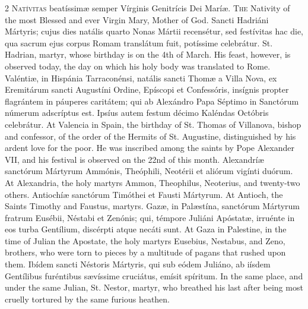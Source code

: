 \begin{paracol}{2}
\lettrine[lines=2]{N}{atívitas} beatíssimæ 
 semper Vírginis Genitrícis Dei Maríæ.
\switchcolumn
{}
\lettrine[lines=2]{T}{he} Nativity of the most Blessed and 
 ever Virgin Mary, Mother of God.
\switchcolumn*
{}
Sancti Hadriáni 
 Mártyris; cujus dies natális quarto Nonas Mártii recensétur, sed festívitas 
 hac die, qua sacrum ejus corpus Romam translátum fuit, potíssime celebrátur.
\switchcolumn
{}
St. Hadrian, martyr, whose birthday 
 is on the 4th of March. His feast, however, is observed today, the day 
 on which his holy body was translated to Rome.
\switchcolumn*
{}
Valéntiæ, in Hispánia 
 Tarraconénsi, natális sancti Thomæ a Villa Nova, ex Eremitárum sancti 
 Augustíni Ordine, Epíscopi et Confessóris, insígnis propter flagrántem in 
 páuperes caritátem; qui ab Alexándro Papa Séptimo in Sanctórum númerum 
 adscríptus est. Ipsíus autem festum décimo Kaléndas Octóbris 
 celebrátur.
\switchcolumn
{}
At Valencia in Spain, the birthday 
 of St. Thomas of Villanova, bishop and confessor, of the order of the 
 Hermits of St. Augustine, distinguished by his ardent love for the poor. 
 He was inscribed among the saints by Pope Alexander VII, and his festival is 
 observed on the 22nd of this month.
\switchcolumn*
{}
Alexandríæ sanctórum 
 Mártyrum Ammónis, Theóphili, Neotérii et aliórum vigínti duórum.
\switchcolumn
{}
At Alexandria, the holy martyrs 
 Ammon, Theophilus, Neoterius, and twenty-two others.
\switchcolumn*
{}
Antiochíæ sanctórum 
 Timóthei et Fausti Mártyrum.
\switchcolumn
{}
At Antioch, the Saints Timothy and 
 Faustus, martyrs.
\switchcolumn*
{}
Gazæ, in Palæstína, 
 sanctórum Mártyrum fratrum Eusébii, Néstabi et Zenónis; qui, témpore Juliáni 
 Apóstatæ, irruénte in eos turba Gentílium, discérpti atque necáti sunt.
\switchcolumn
{}
At Gaza in Palestine, in the time of 
 Julian the Apostate, the holy martyrs Eusebius, Nestabus, and Zeno, 
 brothers, who were torn to pieces by a multitude of pagans that rushed upon 
 them.
\switchcolumn*
{}
Ibídem sancti Néstoris 
 Mártyris, qui sub eódem Juliáno, ab iísdem Gentílibus furéntibus sævíssime 
 cruciátus, emísit spíritum.
\switchcolumn
{}
In the same place, and under the 
 same Julian, St. Nestor, martyr, who breathed his last after being most 
 cruelly tortured by the same furious heathen.

\end{paracol}
